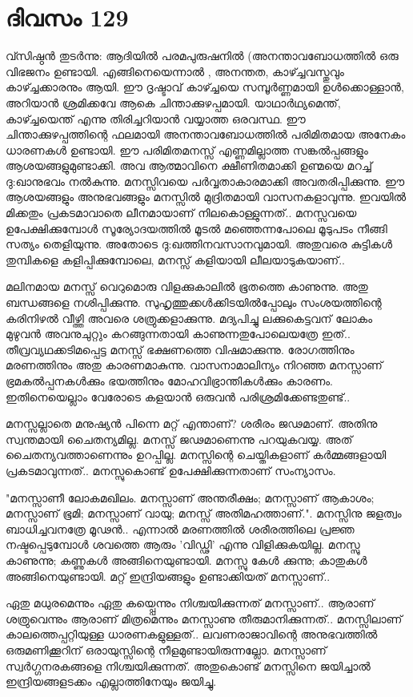  
\section{ദിവസം 129}


വ്സിഷ്ഠന്‍ തുടര്‍ന്നു: ആദിയില്‍ പരമപുരുഷനില്‍ (അനന്താവബോധത്തില്‍ ഒരു വിഭജനം ഉണ്ടായി. എങ്ങിനെയെന്നാല്‍ , അനന്തത, കാഴ്ച്ചവസ്തുവും കാഴ്ച്ചക്കാരനും ആയി. ഈ ദൃഷ്ടാവ്‌ കാഴ്ച്ചയെ സമ്പൂര്‍ണ്ണമായി ഉള്‍ക്കൊള്ളാന്‍, അറിയാന്‍ ശ്രമിക്കവേ ആകെ ചിന്താക്കുഴപ്പമായി. യാഥാര്‍ഥ്യമെന്ത്‌, കാഴ്ച്ചയെന്ത്‌ എന്നു തിരിച്ചറിയാന്‍ വയ്യാത്ത ഒരവസ്ഥ. ഈ ചിന്താക്കുഴപ്പത്തിന്റെ ഫലമായി അനന്താവബോധത്തില്‍ പരിമിതമായ അനേകം ധാരണകള്‍ ഉണ്ടായി. ഈ പരിമിതമനസ്സ്‌ എണ്ണമില്ലാത്ത സങ്കല്‍പ്പങ്ങളും ആശയങ്ങളുമുണ്ടാക്കി. അവ ആത്മാവിനെ ക്ഷീണിതമാക്കി ഉണ്മയെ മറച്ച്‌ ദു:ഖാനുഭവം നല്‍കുന്നു. മനസ്സിവയെ പര്‍വ്വതാകാരമാക്കി അവതരിപ്പിക്കുന്നു. ഈ ആശയങ്ങളും അനുഭവങ്ങളും മനസ്സില്‍ മുദ്രിതമായി വാസനകളാവുന്നു. ഇവയില്‍ മിക്കതും പ്രകടമാവാതെ ലീനമായാണ്‌ നിലകൊള്ളുന്നത്‌.. മനസ്സവയെ ഉപേക്ഷിക്കുമ്പോള്‍ സൂര്യോദയത്തില്‍ മൂടല്‍ മഞ്ഞെന്നപോലെ മൂടുപടം നീങ്ങി സത്യം തെളിയുന്നു. അതോടെ ദു:ഖത്തിനവസാനവുമായി. അതുവരെ കുട്ടികള്‍ തുമ്പികളെ കളിപ്പിക്കുമ്പോലെ, മനസ്സ്‌ കളിയായി ലീലയാടുകയാണ്‌..

മലിനമായ മനസ്സ്‌ വെറുമൊരു വിളക്കുകാലില്‍ ഭൂതത്തെ കാണുന്നു. അതു ബന്ധങ്ങളെ നശിപ്പിക്കുന്നു. സുഹൃത്തുക്കള്‍ക്കിടയില്‍പ്പോലും സംശയത്തിന്റെ കരിനിഴല്‍ വീഴ്ത്തി അവരെ ശത്രുക്കളാക്കുന്നു. മദ്യപിച്ചു ലക്കുകെട്ടവന്‌ ലോകം മുഴുവന്‍ അവനുചുറ്റും കറങ്ങുന്നതായി കാണുന്നതുപോലെയത്രേ ഇത്‌.. തീവ്രവ്യഥക്കടിമപ്പെട്ട മനസ്സ്‌ ഭക്ഷണത്തെ വിഷമാക്കുന്നു. രോഗത്തിനും മരണത്തിനും അതു കാരണമാകുന്നു. വാസനാമാലിന്യം നിറഞ്ഞ മനസ്സാണ്‌ ഭ്രമകല്‍പ്പനകള്‍ക്കും ഭയത്തിനും മോഹവിഭ്രാന്തികള്‍ക്കും കാരണം. ഇതിനെയെല്ലാം വേരോടെ കളയാന്‍ ഒരുവന്‍ പരിശ്രമിക്കേണ്ടതുണ്ട്‌..

മനസ്സല്ലാതെ മനുഷ്യന്‍ പിന്നെ മറ്റ്‌ എന്താണ്‌? ശരീരം ജഢമാണ്‌. അതിനു സ്വന്തമായി ചൈതന്യമില്ല. മനസ്സ്‌ ജഢമാണെന്നു പറയുകവയ്യ. അത്‌ ചൈതന്യവത്താണെന്നും ഉറപ്പില്ല. മനസ്സിന്റെ ചെയ്തികളാണ്‌ കര്‍മ്മങ്ങളായി പ്രകടമാവുന്നത്‌.. മനസ്സുകൊണ്ട്‌ ഉപേക്ഷിക്കുന്നതാണ്‌ സംന്യാസം.

"മനസ്സാണീ ലോകമഖിലം. മനസ്സാണ്‌ അന്തരീക്ഷം; മനസ്സാണ്‌ ആകാശം; മനസ്സാണ്‌ ഭൂമി; മനസ്സാണ്‌ വായു; മനസ്സ്‌ അതിമഹത്താണ്‌.". മനസ്സിനു ജളത്വം ബാധിച്ചവനത്രേ മൂഢന്‍.. എന്നാല്‍ മരണത്തില്‍ ശരീരത്തിലെ പ്രജ്ഞ നഷ്ടപ്പെടുമ്പോള്‍ ശവത്തെ ആരും 'വിഡ്ഢി' എന്നു വിളിക്കുകയില്ല. മനസ്സു കാണുന്നു; കണ്ണുകള്‍ അങ്ങിനെയുണ്ടായി. മനസ്സു കേള്‍ ക്കുന്നു; കാതുകള്‍ അങ്ങിനെയുണ്ടായി. മറ്റ്‌ ഇന്ദ്രിയങ്ങളും ഉണ്ടാക്കിയത്‌ മനസ്സാണ്‌..

ഏതു മധുരമെന്നും ഏതു കയ്പ്പെന്നും നിശ്ചയിക്കുന്നത്‌ മനസ്സാണ്‌.. ആരാണ്‌ ശത്രുവെന്നും ആരാണ്‌ മിത്രമെന്നും മനസ്സാണു തീരുമാനിക്കുന്നത്‌.. മനസ്സിലാണ്‌ കാലത്തെപ്പറ്റിയുള്ള ധാരണകളുള്ളത്‌.. ലവണരാജാവിന്റെ അനുഭവത്തില്‍ ഒരുമണിക്കൂറിന്‌ ഒരായുസ്സിന്റെ നീളമുണ്ടായിരുന്നല്ലോ. മനസ്സാണ്‌ സ്വര്‍ഗ്ഗനരകങ്ങളെ നിശ്ചയിക്കുന്നത്‌. അതുകൊണ്ട്‌ മനസ്സിനെ ജയിച്ചാല്‍ ഇന്ദ്രിയങ്ങളടക്കം എല്ലാത്തിനേയും ജയിച്ചു. 

